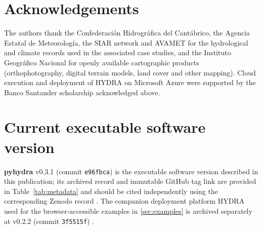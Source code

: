 \documentclass[preprint,12pt,a4paper]{elsarticle}
\newcommand{\pyhydra}{\textbf{pyhydra}}
\begin{document}
\section*{Acknowledgements}
The authors thank the Confederaci{\'o}n Hidrogr{\'a}fica del Cant{\'a}brico,
the Agencia Estatal de Meteorolog{\'i}a, the SIAR network and AVAMET for the
hydrological and climate records used in the associated case studies, and the
Instituto Geogr{\'a}fico Nacional for openly available cartographic products
(orthophotography, digital terrain models, land cover and other mapping).
Cloud execution and deployment of HYDRA on Microsoft Azure were supported
by the Banco Santander scholarship acknowledged above.




\section*{Current executable software version}
\pyhydra{} v0.3.1 (commit \texttt{e96fbca}) is the executable software version
described in this publication; its archived record and immutable GitHub
tag link are provided in Table~\ref{tab:metadata} and should be cited
independently using the corresponding Zenodo record
\citep{navas2026pyhydra}. The companion deployment platform HYDRA used for
the browser-accessible examples in \cref{sec:examples} is archived
separately at v0.2.2 (commit \texttt{3f5515f}) \citep{navas2026hydrarepo}.
\end{document}
